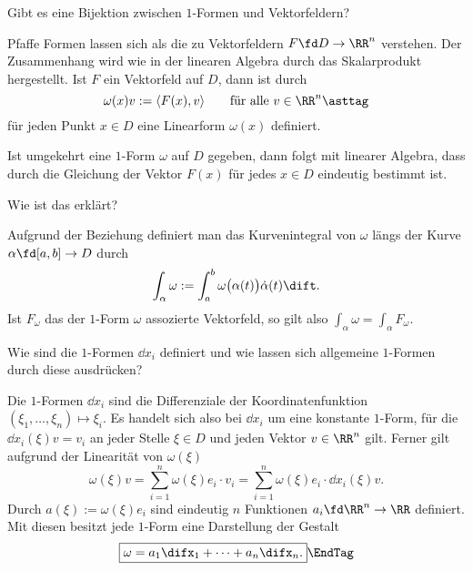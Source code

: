 \begin{frage}
  Gibt es eine Bijektion zwischen $1$-Formen und Vektorfeldern?
\end{frage}

\begin{antwort}
  Pfaff\sch e Formen lassen sich als die zu Vektorfeldern 
  $F\fd D\to\RR^n$  verstehen. 
  Der Zusammenhang wird wie in der linearen Algebra durch das 
  Skalarprodukt hergestellt. Ist $F$ ein Vektorfeld auf $D$, dann ist  
  durch 
  \[
  \omega(x) v := \langle F(x), v \rangle \qquad\text{für alle $v\in \RR^n$}
  \asttag
  \]     
  für jeden Punkt $x\in D$ eine Linearform $\omega(x)$ definiert. 

  Ist umgekehrt eine $1$-Form $\omega$ auf $D$ gegeben, dann folgt mit 
  linearer Algebra, dass durch die Gleichung {\astref}
  der Vektor $F(x)$ für jedes $x\in D$ eindeutig bestimmt ist. 
  \AntEnd
\end{antwort}

\begin{frage}
  Wie ist das  erklärt?
\end{frage}

\begin{antwort}
  Aufgrund der Beziehung {\astref} definiert man das Kurvenintegral 
  von $\omega$ längs der Kurve $\alpha\fd [a,b]\to D$ durch 
  \[
  \int_\alpha \omega := 
  \int_a^b \omega\big( \alpha(t) \big) \dot{\alpha}(t) \dift.
  \]
  Ist $F_\omega$ das der $1$-Form $\omega$ assozierte Vektorfeld, 
  so gilt also $\int_\alpha \omega = \int_\alpha F_\omega$. \AntEnd
\end{antwort}  

\begin{frage}\label{12_koorddiff}
  Wie sind die $1$-Formen $\dd x_i$ definiert und wie 
  lassen sich allgemeine $1$-Formen durch diese ausdrücken? 
\end{frage}

\begin{antwort}
  Die $1$-Formen $\dd x_i$ sind die Differenziale der 
  Koordinatenfunktion $(\xi_1,\ldots, \xi_n) \mapsto \xi_i$. 
  Es handelt sich also bei $\dd x_i$ um eine konstante $1$-Form, 
  für die $\dd x_i (\xi ) v =v_i$ an jeder Stelle $\xi\in D$ und 
  jeden Vektor $v\in \RR^n$ gilt.    
  Ferner gilt aufgrund der Linearität von $\omega(\xi)$    
  \[
  \omega( \xi ) v = \sum_{i=1}^n \omega (\xi ) e_i \cdot v_i = 
  \sum_{i=1}^n \omega (\xi ) e_i \cdot \dd x_i (\xi) v. 
  \]
  Durch $a(\xi) := \omega (\xi ) e_i$ sind eindeutig $n$ Funktionen 
  $a_i \fd \RR^n \to \RR$ definiert. Mit diesen besitzt 
  jede $1$-Form eine Darstellung der Gestalt 
  \[
  \boxed{
    \omega = a_1 \difx_1 + \cdots + a_n \difx_n. 
  } \EndTag
  \]
\end{antwort}


